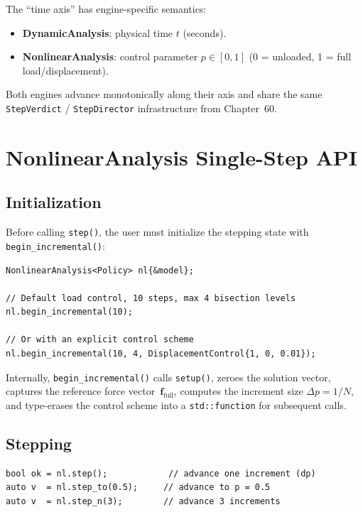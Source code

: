 The ``time axis'' has engine-specific semantics:
\begin{itemize}
  \item \textbf{DynamicAnalysis}: physical time $t$ (seconds).
  \item \textbf{NonlinearAnalysis}: control parameter $p \in [0, 1]$
        (0 = unloaded, 1 = full load/displacement).
\end{itemize}

Both engines advance monotonically along their axis and share the same
\texttt{StepVerdict} / \texttt{StepDirector} infrastructure from
Chapter~60.


\section{NonlinearAnalysis Single-Step API}

\subsection{Initialization}

Before calling \texttt{step()}, the user must initialize the stepping
state with \texttt{begin\_incremental()}:

\begin{verbatim}
NonlinearAnalysis<Policy> nl{&model};

// Default load control, 10 steps, max 4 bisection levels
nl.begin_incremental(10);

// Or with an explicit control scheme
nl.begin_incremental(10, 4, DisplacementControl{1, 0, 0.01});
\end{verbatim}

Internally, \texttt{begin\_incremental()} calls \texttt{setup()}, zeroes
the solution vector, captures the reference force vector~$\mathbf{f}_\text{full}$,
computes the increment size $\Delta p = 1/N$, and type-erases the control
scheme into a \texttt{std::function} for subsequent calls.

\subsection{Stepping}

\begin{verbatim}
bool ok = nl.step();            // advance one increment (dp)
auto v  = nl.step_to(0.5);     // advance to p = 0.5
auto v  = nl.step_n(3);        // advance 3 increments
\end{verbatim}


